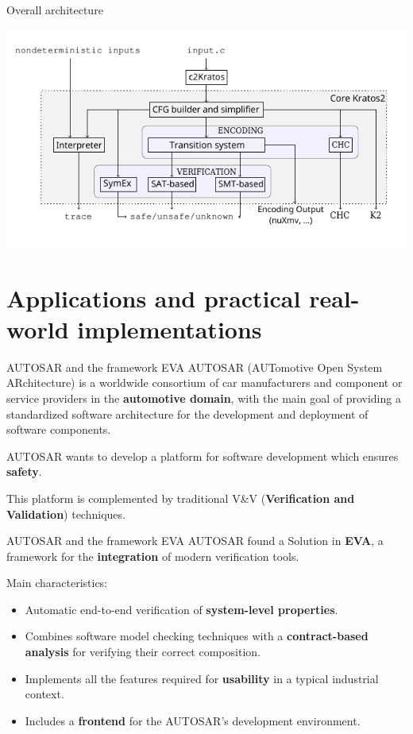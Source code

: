 \documentclass[aspectratio=1610,10.5pt]{beamer} %
\begin{document}
\begin{frame}{Overall architecture}
    \begin{center}
        \includegraphics[height=%
        0.85\textheight]{../res/architecture-paper}
    \end{center}
\end{frame}

\section{Applications and practical real-world implementations}

\begin{frame}{AUTOSAR and the framework EVA}
    AUTOSAR (AUTomotive Open System ARchitecture) is a worldwide consortium of car manufacturers and component or service providers in the \textbf{automotive domain}, with the main goal of providing a standardized software architecture for the development and deployment of software components.

    \bigskip

    AUTOSAR wants to develop a platform for software development which ensures \textbf{safety}.

    \bigskip

    This platform is complemented by traditional V\&V (\textbf{Verification and Validation}) techniques.
\end{frame}

\begin{frame}{AUTOSAR and the framework EVA}
    AUTOSAR found a Solution in \textbf{EVA}, a framework for the \textbf{integration} of modern verification tools.

    \smallskip

    Main characteristics:

    \begin{itemize}
        \item Automatic end-to-end verification of \textbf{system-level properties}.
        \item Combines software model checking techniques with a \textbf{contract-based analysis} for verifying their correct composition.
        \item Implements all the features required for \textbf{usability} in a typical industrial context.
        \item Includes a \textbf{frontend} for the AUTOSAR's development environment.
    \end{itemize}
\end{frame}
\end{document}
